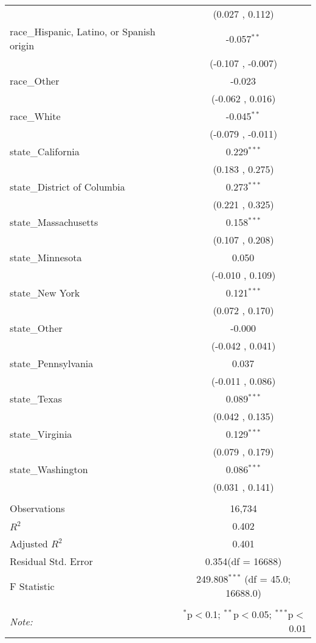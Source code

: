 \begin{table}[!htbp]
\begin{tabular}{@{\extracolsep{5pt}}lc}
  & (0.027 , 0.112) \\
 race_Hispanic, Latino, or Spanish origin & -0.057$^{**}$ \\
  & (-0.107 , -0.007) \\
 race_Other & -0.023$^{}$ \\
  & (-0.062 , 0.016) \\
 race_White & -0.045$^{**}$ \\
  & (-0.079 , -0.011) \\
 state_California & 0.229$^{***}$ \\
  & (0.183 , 0.275) \\
 state_District of Columbia & 0.273$^{***}$ \\
  & (0.221 , 0.325) \\
 state_Massachusetts & 0.158$^{***}$ \\
  & (0.107 , 0.208) \\
 state_Minnesota & 0.050$^{}$ \\
  & (-0.010 , 0.109) \\
 state_New York & 0.121$^{***}$ \\
  & (0.072 , 0.170) \\
 state_Other & -0.000$^{}$ \\
  & (-0.042 , 0.041) \\
 state_Pennsylvania & 0.037$^{}$ \\
  & (-0.011 , 0.086) \\
 state_Texas & 0.089$^{***}$ \\
  & (0.042 , 0.135) \\
 state_Virginia & 0.129$^{***}$ \\
  & (0.079 , 0.179) \\
 state_Washington & 0.086$^{***}$ \\
  & (0.031 , 0.141) \\
\hline \\[-1.8ex]
 Observations & 16,734 \\
 $R^2$ & 0.402 \\
 Adjusted $R^2$ & 0.401 \\
 Residual Std. Error & 0.354(df = 16688)  \\
 F Statistic & 249.808$^{***}$ (df = 45.0; 16688.0) \\
\hline
\hline \\[-1.8ex]
\textit{Note:} & \multicolumn{1}{r}{$^{*}$p$<$0.1; $^{**}$p$<$0.05; $^{***}$p$<$0.01} \\
\end{tabular}
\end{table}